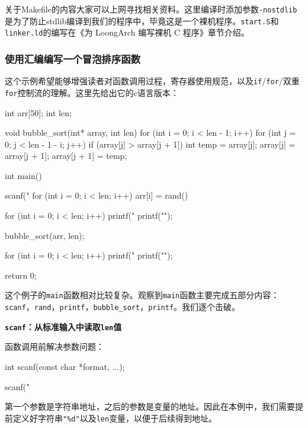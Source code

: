 关于Makefile的内容大家可以上网寻找相关资料。这里编译时添加参数\texttt{-nostdlib}是为了防止stdlib编译到我们的程序中，毕竟这是一个裸机程序。\texttt{start.S}和\texttt{linker.ld}的编写在《为 LoongArch 编写裸机 C 程序》章节介绍。

\subsubsection{使用汇编编写一个冒泡排序函数}\label{sec:02-software-preparation-009}

这个示例希望能够增强读者对函数调用过程，寄存器使用规范，以及\texttt{if}/\texttt{for}/双重\texttt{for}控制流的理解。这里先给出它的c语言版本：

\begin{CodeBlock}[language=BookC]
int arr[50];
int len;

void bubble_sort(int* array, int len) {
    for (int i = 0; i < len - 1; i++) {
        for (int j = 0; j < len - 1 - i; j++) {
            if (array[j] > array[j + 1]) {
                int temp = array[j];
                array[j] = array[j + 1];
                array[j + 1] = temp;
            }
        }
    }
}

int main() {
    scanf("%
    for (int i = 0; i < len; i++) arr[i] = rand() %

    for (int i = 0; i < len; i++) printf("%
    printf("\n");

    bubble_sort(arr, len);

    for (int i = 0; i < len; i++) printf("%
    printf("\n");

    return 0;
}
\end{CodeBlock}

这个例子的\texttt{main}函数相对比较复杂。观察到\texttt{main}函数主要完成五部分内容：\texttt{scanf}，\texttt{rand}，\texttt{printf}，\texttt{bubble\_sort}，\texttt{printf}。我们逐个击破。

\textbf{\texttt{scanf}：从标准输入中读取\texttt{len}值}

函数调用前解决参数问题：

\begin{CodeBlock}[language=BookC]
int scanf(const char *format, ...);

scanf("%
\end{CodeBlock}

第一个参数是字符串地址，之后的参数是变量的地址。因此在本例中，我们需要提前定义好字符串\texttt{"\%d"}以及\texttt{len}变量，以便于后续得到地址。


